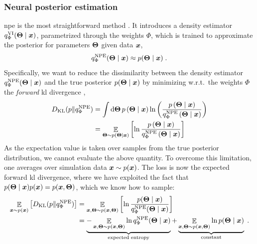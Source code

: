 \subsubsection{Neural posterior estimation}

\Gls*{npe} is the most straightforward method \cite{Papamakarios:2016ctj, Greenberg:2019aa}. It introduces a density estimator $q^\text{VI}_\Phi(\bm{\Theta}\mid\bm{x})$, parametrized through the weights $\Phi$, which is trained to approximate the posterior for parameters $\bm{\Theta}$ given data $\bm{x}$,
%
\begin{equation}
    q^\text{NPE}_\Phi(\bm{\Theta} \mid \bm{x}) \approx p(\bm{\Theta}\mid\bm{x})\;.
\end{equation}
%
Specifically, we want to reduce the dissimilarity between the density estimator $q^\text{NPE}_\Phi(\bm{\Theta} \mid \bm{x})$ and the true posterior $p(\bm{\Theta}\mid\bm{x})$ by minimizing w.r.t.~the weights $\Phi$ the \emph{forward} \gls*{kl} divergence \cite{Kullback:1951zyt},
%
\begin{align} \label{eq:fkl}
	D_{\mathrm{KL}}(p \| q^\text{NPE}_\Phi) &= \int \dd \bm{\Theta} \,p\left(\bm{\Theta} \mid \bm{x}\right) \ln \left(\frac{p\left(\bm{\Theta} \mid \bm{x}\right)}{q^\text{NPE}_\Phi\left(\bm{\Theta} \mid \bm{x}\right)}\right) \\
	& =\mathop{\mathbb{E}}\limits_{\bm{\Theta} \sim p\left(\bm{\Theta} \mid \bm{x}\right)}\left[\ln \frac{p\left(\bm{\Theta} \mid \bm{x}\right)}{q^\text{NPE}_\Phi\left(\bm{\Theta} \mid \bm{x}\right)}\right]
\end{align}
%
%
As the expectation value is taken over samples from the true posterior distribution, we cannot evaluate the above quantity. To overcome this limitation, one averages over simulation data $\bm{x} \sim p(\bm{x})$. The loss is now the expected forward \gls*{kl} divergence, where we have exploited the fact that $p(\bm{\Theta}\mid \bm{x}) p(\bm{x})=p(\bm{x}, \bm{\Theta})$, which we know how to sample:
%
\begin{align}
	\mathop{\mathbb{E}}\limits_{\bm{x} \sim p(\bm{x})}\left[D_{\mathrm{KL}}(p \| q^\text{NPE}_\Phi)\right] & =\mathop{\mathbb{E}}\limits_{\bm{x}, \bm{\Theta} \sim p(\bm{x}, \bm{\Theta})}\left[\ln \frac{p(\bm{\Theta} \mid \bm{x})}{q^\text{NPE}_\Phi(\bm{\Theta} \mid \bm{x})}\right] \\
	& =\underbrace{-\mathop{\mathbb{E}}\limits_{\bm{x}, \bm{\Theta} \sim p(\bm{x}, \bm{\Theta})} \ln q^\text{NPE}_\Phi(\bm{\Theta} \mid \bm{x})}_{\text{expected entropy}}+\underbrace{\mathop{\mathbb{E}}\limits_{\bm{x}, \bm{\Theta} \sim p(\bm{x}, \bm{\Theta})} \ln p(\bm{\Theta} \mid \bm{x})}_{\text {constant}} \;.
\end{align}

